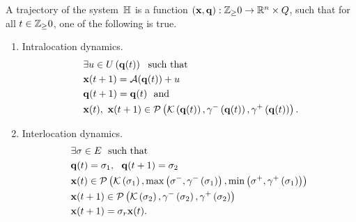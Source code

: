 A trajectory of the system~$\mathbb{H}$ is a function
$\left({\bf x},{\bf q}\right):\mathbb{Z}_\geq 0\rightarrow\mathbb{R}^n\times Q$, such
that for all
$t\in\mathbb{Z}_\geq 0$, one of the following is true.
\begin{enumerate}
\item Intralocation dynamics.
\begin{align}~\label{eqn:intralocation}
\begin{split}
& \exists u\in U\left({\bf q}(t)\right)~~\text{such that}\\
& {\bf x}(t+1) = \mathcal{A}({\bf q}(t))+u\\ 
& {\bf q}(t+1) = {\bf q}(t)~~
\text{and}\\
& {\bf x}(t),~{\bf x}(t+1)\in\mathcal{P}\left(\mathcal{K}\left({\bf q}(t)\right),\gamma^-\left({\bf q}(t)\right),\gamma^+\left({\bf q}(t)\right)\right).
\end{split}
\end{align}
\item Interlocation dynamics.
\begin{align} 
\begin{split}
& \exists \sigma\in E~~\text{such that}\\
& {\bf q}(t)=\sigma_{1},~~{\bf q}(t+1)=\sigma_{2}\\
& {\bf x}(t)\in\mathcal{P}\left(\mathcal{K}\left(\sigma_{1}\right),\max\left(\sigma^-,\gamma^-\left(\sigma_{1}\right)\right),\min\left(\sigma^+,\gamma^+\left(\sigma_{1}\right)\right)\right) \\
& {\bf x}(t+1)\in \mathcal{P}\left(\mathcal{K}\left(\sigma_{2}\right),\gamma^-\left(\sigma_{2}\right),\gamma^+\left(\sigma_{2}\right)\right)\\
& {\bf x}(t+1) = \sigma_r{\bf x}(t).
\end{split}
\end{align}
\end{enumerate}

